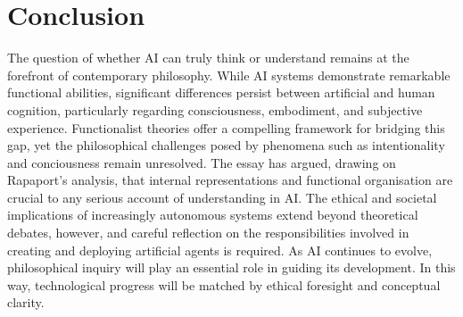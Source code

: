 \documentclass[runningheads]{llncs}
\begin{document}
\section{Conclusion}
The question of whether AI can truly think or understand remains at the forefront of contemporary philosophy. While AI systems demonstrate remarkable functional abilities, significant differences persist between artificial and human cognition, particularly regarding consciousness, embodiment, and subjective experience. Functionalist theories offer a compelling framework for bridging this gap, yet the philosophical challenges posed by phenomena such as intentionality and conciousness remain unresolved.
The essay has argued, drawing on Rapaport's analysis, that internal representations and functional organisation are crucial to any serious account of understanding in AI. The ethical and societal implications of increasingly autonomous systems extend beyond theoretical debates, however, and careful reflection on the responsibilities involved in creating and deploying artificial agents is required. As AI continues to evolve, philosophical inquiry will play an essential role in guiding its development. In this way, technological progress will be matched by ethical foresight and conceptual clarity.
%
%

\end{document}
